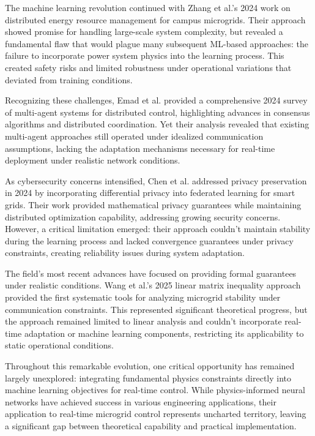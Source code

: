 \documentclass[12pt]{article}
\begin{document}
The machine learning revolution continued with Zhang et al.'s 2024 work \cite{zhang2024} on distributed energy resource management for campus microgrids. Their approach showed promise for handling large-scale system complexity, but revealed a fundamental flaw that would plague many subsequent ML-based approaches: the failure to incorporate power system physics into the learning process. This created safety risks and limited robustness under operational variations that deviated from training conditions.

Recognizing these challenges, Emad et al. provided a comprehensive 2024 survey \cite{emad2024} of multi-agent systems for distributed control, highlighting advances in consensus algorithms and distributed coordination. Yet their analysis revealed that existing multi-agent approaches still operated under idealized communication assumptions, lacking the adaptation mechanisms necessary for real-time deployment under realistic network conditions.

As cybersecurity concerns intensified, Chen et al. addressed privacy preservation in 2024 \cite{chen2024} by incorporating differential privacy into federated learning for smart grids. Their work provided mathematical privacy guarantees while maintaining distributed optimization capability, addressing growing security concerns. However, a critical limitation emerged: their approach couldn't maintain stability during the learning process and lacked convergence guarantees under privacy constraints, creating reliability issues during system adaptation.

The field's most recent advances have focused on providing formal guarantees under realistic conditions. Wang et al.'s 2025 linear matrix inequality approach \cite{wang2025} provided the first systematic tools for analyzing microgrid stability under communication constraints. This represented significant theoretical progress, but the approach remained limited to linear analysis and couldn't incorporate real-time adaptation or machine learning components, restricting its applicability to static operational conditions.

Throughout this remarkable evolution, one critical opportunity has remained largely unexplored: integrating fundamental physics constraints directly into machine learning objectives for real-time control. While physics-informed neural networks have achieved success in various engineering applications, their application to real-time microgrid control represents uncharted territory, leaving a significant gap between theoretical capability and practical implementation.
\end{document}
